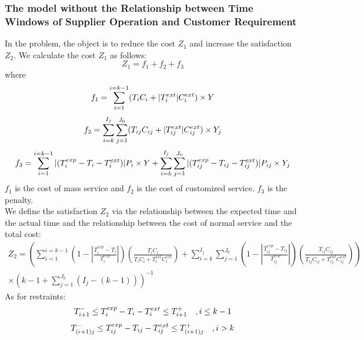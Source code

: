 \documentclass[12pt,a4paper]{article}
\begin{document}
\subsubsection{The model without the Relationship between Time Windows of Supplier Operation and Customer Requirement}
In the problem, the object is to reduce the cost $Z_1$ and increase the satisfaction $Z_2$.
We calculate the cost $Z_1$ as follows:
\begin{equation}
	Z_1=f_1+f_2+f_3
\end{equation}
where
\begin{equation}
	f_1 =\sum_{i=1}^{i=k-1}(T_iC_i+|T_i^{ext}|C_i^{ext})\times Y\\
\end{equation}
\begin{equation}
	f_2 =\sum_{i=k}^{I_j}\sum_{j=1}^{J_0}(T_{ij}C_{ij}+|T_{ij}^{ext}|C_{ij}^{ext})\times Y_j\\
\end{equation}
\begin{equation}
	f_3=\sum_{i=1}^{i=k-1}|(T_i^{exp}-T_i-T_i^{ext})|P_i\times Y+\sum_{i=k}^{I_j}\sum_{j=1}^{J_0}|(T_{ij}^{exp}-T_{ij}-T_{ij}^{ext})|P_{ij}\times Y_j\\
\end{equation}
$f_1$ is the cost of mass service and $f_2$ is the cost of customized service. $f_3$ is the penalty.\\
We define the satisfaction $Z_2$ via the relationship between the expected time and the actual time and the relationship between the cost of normal service and the total cost\cite{Liu}:
\begin{equation}
\begin{split}
	Z_2=(\sum_{i=1}^{i=k-1}(1-|\frac{T_i^{exp}-T_i}{T_i^{exp}}|)(\frac{T_iC_i}{T_iC_i+T_i^{ext}C_i^{ext}})+\sum_{i=k}^{I_j}\sum_{j=1}^{J_0}(1-|\frac{T_{ij}^{exp}-T_{ij}}{T_{ij}^{exp}}|)(\frac{T_{ij}C_{ij}}{T_{ij}C_{ij}+T_{ij}^{ext}C_{ij}^{ext}}))\\
	\times(k-1+\sum_{j=1}^{J_0}(I_j-(k-1)))^{-1}
\end{split}
\end{equation}
As for restraints:
\begin{equation}
	T_{i+1}^-\leq T_i^{exp}-T_i-T_i^{ext}\leq T_{i+1}^+ \quad ,i\leq k-1\\
\end{equation}
\begin{equation}
	T_{(i+1)j}^-\leq T_{ij}^{exp}-T_{ij}-T_{ij}^{ext}\leq T_{(i+1)j}^+ \quad, i>k\\
\end{equation}
\end{document}

